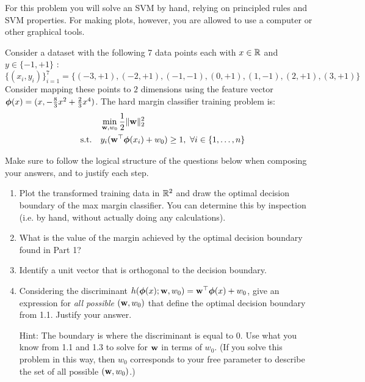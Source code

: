 \documentclass[submit]{harvardml}
\begin{document}
\begin{problem}

  For this problem you will solve an SVM by hand, relying on principled rules and SVM properties. 
  For making plots, however, you are allowed to use a computer or other graphical tools.

Consider a dataset with the following 7 data points each with $x \in \mathbb{R}$ and $y \in \{ -1, +1 \}$ : \[\{(x_i, y_i)\}_{i = 1}^7 =\{(-3 , +1) , (-2 , +1 ) , (-1,  -1 ), (0, +1), ( 1 , -1 ), ( 2 , +1 ) , (3 , +1 )\}\] Consider
mapping these points to $2$ dimensions using the feature vector $\boldsymbol{\phi}(x) =  (x, -\frac{8}{3}x^2 + \frac{2}{3}x^4 )$. The hard margin classifier training problem is:
%
\begin{align*}
  &\min_{\mathbf{w}, w_0} \frac{1}{2}\|\mathbf{w}\|_2^2 \label{eq:dcp} \\
  \quad \text{s.t.} \quad & y_i(\mathbf{w}^\top \boldsymbol{\phi}(x_i) + w_0) \geq 1,~\forall i \in \{1,\ldots, n\}\notag
\end{align*}

Make sure to follow the logical structure of
the questions below when composing your answers, and to justify each step.

\begin{enumerate}
\item Plot the transformed training data in $\mathbb{R}^2$ and draw the
  optimal decision boundary of the max margin classifier. You can
  determine this by inspection (i.e. by hand, without actually doing
  any calculations).

\item What is the value of the margin achieved by the optimal decision
  boundary found in Part 1?

\item Identify a unit vector that is orthogonal to the decision boundary.

\item Considering the discriminant
  $h(\boldsymbol{\phi}(x);\mathbf{w},w_0)=\mathbf{w}^\top\boldsymbol{\phi}(x) +w_0$, give an
  expression for {\em all possible} $(\mathbf{w},w_0)$ that define the
  optimal decision boundary from 1.1.  Justify your answer.

  Hint: The boundary is where the discriminant is equal to 0.  Use
  what you know from 1.1 and 1.3 to solve for $\mathbf{w}$ in terms of
  $w_0$.  (If you solve this problem in this way, then $w_0$
  corresponds to your free parameter to describe the set of all
  possible $(\mathbf{w},w_0)$.)
  

\end{enumerate}
\end{problem}
\end{document}
